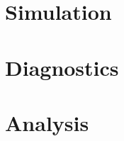 \documentclass[12pt]{article}
\begin{document}
\section{Simulation}\label{sec:simulation}



\section{Diagnostics}\label{sec:diagnostics}



\section{Analysis}\label{sec:analysis}





\newpage
\appendix
\appendixpage





%


\newpage


\end{document}
